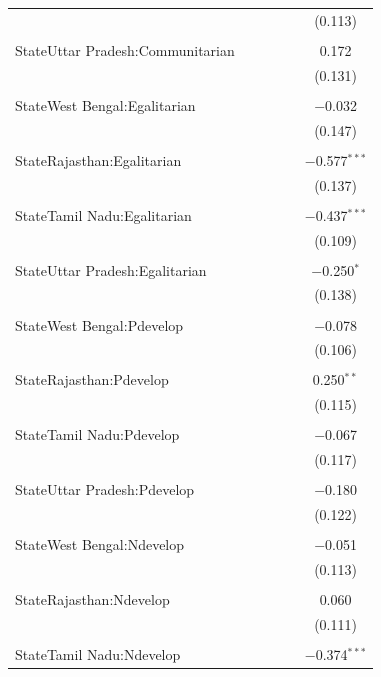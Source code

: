 \documentclass[
]{article}
\begin{document}
\begin{landscape}
\begin{table}[!htbp]
\begin{tabular}{@{\extracolsep{5pt}}lccccc}
  &  &  &  &  & (0.113) \\ 
  & & & & & \\ 
 StateUttar Pradesh:Communitarian &  &  &  &  & 0.172 \\ 
  &  &  &  &  & (0.131) \\ 
  & & & & & \\ 
 StateWest Bengal:Egalitarian &  &  &  &  & $-$0.032 \\ 
  &  &  &  &  & (0.147) \\ 
  & & & & & \\ 
 StateRajasthan:Egalitarian &  &  &  &  & $-$0.577$^{***}$ \\ 
  &  &  &  &  & (0.137) \\ 
  & & & & & \\ 
 StateTamil Nadu:Egalitarian &  &  &  &  & $-$0.437$^{***}$ \\ 
  &  &  &  &  & (0.109) \\ 
  & & & & & \\ 
 StateUttar Pradesh:Egalitarian &  &  &  &  & $-$0.250$^{*}$ \\ 
  &  &  &  &  & (0.138) \\ 
  & & & & & \\ 
 StateWest Bengal:Pdevelop &  &  &  &  & $-$0.078 \\ 
  &  &  &  &  & (0.106) \\ 
  & & & & & \\ 
 StateRajasthan:Pdevelop &  &  &  &  & 0.250$^{**}$ \\ 
  &  &  &  &  & (0.115) \\ 
  & & & & & \\ 
 StateTamil Nadu:Pdevelop &  &  &  &  & $-$0.067 \\ 
  &  &  &  &  & (0.117) \\ 
  & & & & & \\ 
 StateUttar Pradesh:Pdevelop &  &  &  &  & $-$0.180 \\ 
  &  &  &  &  & (0.122) \\ 
  & & & & & \\ 
 StateWest Bengal:Ndevelop &  &  &  &  & $-$0.051 \\ 
  &  &  &  &  & (0.113) \\ 
  & & & & & \\ 
 StateRajasthan:Ndevelop &  &  &  &  & 0.060 \\ 
  &  &  &  &  & (0.111) \\ 
  & & & & & \\ 
 StateTamil Nadu:Ndevelop &  &  &  &  & $-$0.374$^{***}$ \\ 

\end{tabular}
\end{table}
\end{landscape}
\end{document}
